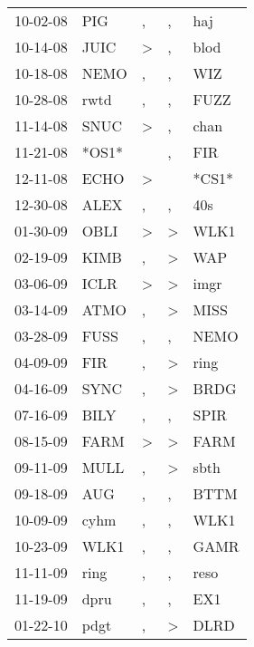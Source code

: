 \begin{supertabular}{lllll}
 10-02-08 &    PIG &                , &                , &    haj \\
 10-14-08 &   JUIC &     \textgreater &                , &   blod \\
 10-18-08 &   NEMO &                , &                , &    WIZ \\
 10-28-08 &   rwtd &                , &                , &   FUZZ \\
 11-14-08 &   SNUC &     \textgreater &                , &   chan \\
 11-21-08 &  *OS1* &                  &                , &    FIR \\
 12-11-08 &   ECHO &     \textgreater &                  &  *CS1* \\
 12-30-08 &   ALEX &                , &                , &    40s \\
 01-30-09 &   OBLI &     \textgreater &     \textgreater &   WLK1 \\
 02-19-09 &   KIMB &                , &     \textgreater &    WAP \\
 03-06-09 &   ICLR &     \textgreater &     \textgreater &   imgr \\
 03-14-09 &   ATMO &                , &     \textgreater &   MISS \\
 03-28-09 &   FUSS &                , &                , &   NEMO \\
 04-09-09 &    FIR &                , &     \textgreater &   ring \\
 04-16-09 &   SYNC &                , &     \textgreater &   BRDG \\
 07-16-09 &   BILY &                , &                , &   SPIR \\
 08-15-09 &   FARM &     \textgreater &     \textgreater &   FARM \\
 09-11-09 &   MULL &                , &     \textgreater &   sbth \\
 09-18-09 &    AUG &                , &                , &   BTTM \\
 10-09-09 &   cyhm &                , &                , &   WLK1 \\
 10-23-09 &   WLK1 &                , &                , &   GAMR \\
 11-11-09 &   ring &                , &                , &   reso \\
 11-19-09 &   dpru &                , &                , &    EX1 \\
 01-22-10 &   pdgt &                , &     \textgreater &   DLRD \\

\end{supertabular}
